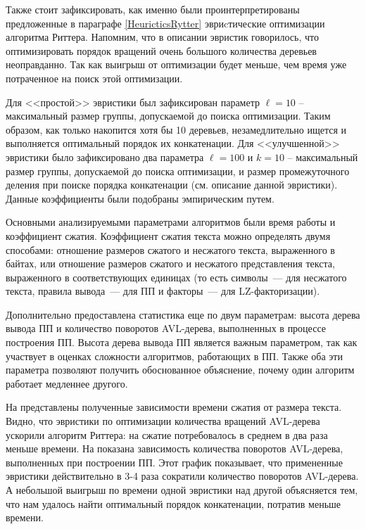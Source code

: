 \documentclass[14pt]{article}
\begin{document}
Также стоит зафиксировать, как именно были проинтерпретированы предложенные в параграфе \ref{HeuricticsRytter} эвриcтические оптимизации алгоритма Риттера.
Напомним, что в описании эвристик говорилось, что оптимизировать порядок вращений очень большого количества деревьев неоправданно. Так как выигрыш от оптимизации
будет меньше, чем время уже потраченное на поиск этой оптимизации.

Для <<простой>> эвристики был зафиксирован параметр $\ell = 10$ -- максимальный размер группы, допускаемой до поиска оптимизации.
Таким образом, как только накопится хотя бы 10 деревьев, незамедлительно ищется и выполняется оптимальный порядок их конкатенации.
Для <<улучшенной>> эвристики было зафиксировано два параметра $\ell = 100$ и $k = 10$ -- максимальный размер группы, допускаемой до
поиска оптимизации, и размер промежуточного деления при поиске порядка конкатенации (см. описание данной эвристики). Данные
коэффициенты были подобраны эмпирическим путем.

Основными анализируемыми параметрами алгоритмов были время работы и коэффициент сжатия. Коэффициент сжатия текста можно
определять двумя способами: отношение размеров сжатого и несжатого текста, выраженного в байтах,
или отношение размеров сжатого и несжатого представления текста, выраженного в соответствующих единицах (то есть символы~--- для 
несжатого текста, правила вывода~--- для ПП и факторы~--- для LZ-факторизации).

Дополнительно предоставлена статистика еще по двум параметрам: высота дерева вывода ПП и количество поворотов AVL-дерева,
выполненных в процессе построения ПП. Высота дерева вывода ПП является важным параметром, так как участвует в оценках сложности
алгоритмов, работающих в ПП. Также оба эти параметра позволяют получить обоснованное объяснение, почему один алгоритм работает
медленнее другого.

На  представлены полученные зависимости времени сжатия от размера текста.
Видно, что эвристики по оптимизации количества вращений AVL-дерева ускорили алгоритм Риттера: на сжатие потребовалось
в среднем в два раза меньше времени. На  показана зависимость количества поворотов AVL-дерева,
выполненных при построении ПП. Этот график показывает, что примененные эвристики действительно в 3-4 раза
сократили количество поворотов AVL-дерева. А небольшой выигрыш по времени одной эвристики над другой объясняется тем, что нам удалось
найти оптимальный порядок конкатенации, потратив меньше времени.
\end{document}
